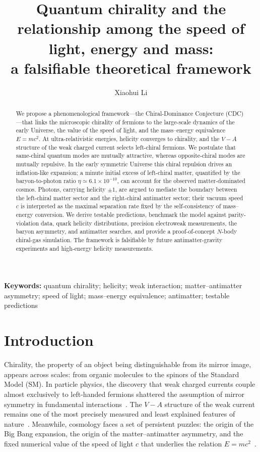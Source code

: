 \documentclass[11pt,a4paper]{article}
\title{\textbf{Quantum chirality and the relationship among the speed of light, energy and mass:\\ a falsifiable theoretical framework}}
\author{Xiaohui Li}
\affil{Independent Researcher, Baoji 721000, China}
\affil{Correspondence: danceluck@163.com; ORCID: 0009-0003-8233-7191}
\date{}
\begin{document}
\maketitle

\begin{abstract}
We propose a phenomenological framework---the Chiral-Dominance Conjecture (CDC)---that links the microscopic chirality of fermions to the large-scale dynamics of the early Universe, the value of the speed of light, and the mass--energy equivalence $E=mc^2$. At ultra-relativistic energies, helicity converges to chirality, and the $V-A$ structure of the weak charged current selects left-chiral fermions. We postulate that same-chiral quantum modes are mutually attractive, whereas opposite-chiral modes are mutually repulsive. In the early symmetric Universe this chiral repulsion drives an inflation-like expansion; a minute initial excess of left-chiral matter, quantified by the baryon-to-photon ratio $\eta \simeq 6.1\times10^{-10}$, can account for the observed matter-dominated cosmos. Photons, carrying helicity $\pm1$, are argued to mediate the boundary between the left-chiral matter sector and the right-chiral antimatter sector; their vacuum speed $c$ is interpreted as the maximal separation rate fixed by the self-consistency of mass--energy conversion. We derive testable predictions, benchmark the model against parity-violation data, quark helicity distributions, precision electroweak measurements, the baryon asymmetry, and antimatter searches, and provide a proof-of-concept $N$-body chiral-gas simulation. The framework is falsifiable by future antimatter-gravity experiments and high-energy helicity measurements.
\end{abstract}

\textbf{Keywords:} quantum chirality; helicity; weak interaction; matter--antimatter asymmetry; speed of light; mass--energy equivalence; antimatter; testable predictions

\section*{Introduction}

Chirality, the property of an object being distinguishable from its mirror image, appears across scales: from organic molecules to the spinors of the Standard Model (SM). In particle physics, the discovery that weak charged currents couple almost exclusively to left-handed fermions shattered the assumption of mirror symmetry in fundamental interactions~\cite{wu1957}. The $V-A$ structure of the weak current remains one of the most precisely measured and least explained features of nature~\cite{lep2006}. Meanwhile, cosmology faces a set of persistent puzzles: the origin of the Big Bang expansion, the origin of the matter--antimatter asymmetry, and the fixed numerical value of the speed of light $c$ that underlies the relation $E=mc^2$~\cite{einstein1905,planck2020}.
\end{document}
